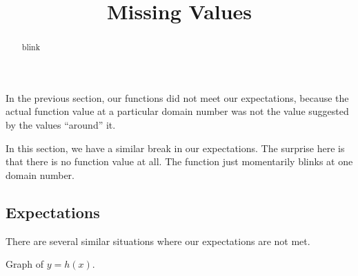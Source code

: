 \documentclass{ximera}
\title{Missing Values}
\begin{document}
\begin{abstract}
blink
\end{abstract}
\maketitle







In the previous section, our functions did not meet our expectations, because the actual function value at a particular domain number was not the value suggested by the values ``around'' it.



In this section, we have a similar break in our expectations. The surprise here is that there is no function value at all. The function just momentarily blinks at one domain number.



























\subsection*{Expectations}

There are several similar situations where our expectations are not met.









Graph of $y = h(x)$.
\end{document}
